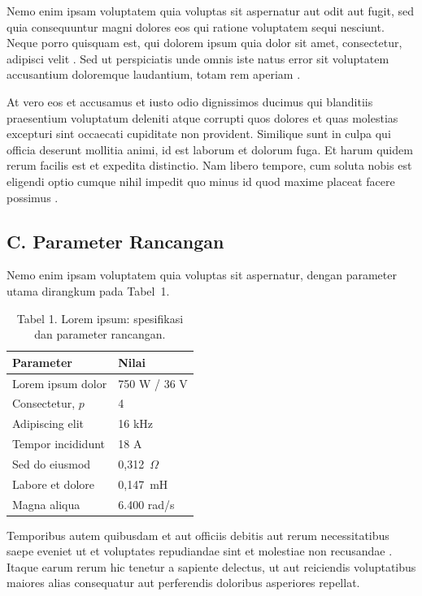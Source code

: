 Nemo enim ipsam voluptatem quia voluptas sit aspernatur aut odit aut fugit, sed
quia consequuntur magni dolores eos qui ratione voluptatem sequi nesciunt. Neque
porro quisquam est, qui dolorem ipsum quia dolor sit amet, consectetur, adipisci
velit \cite{ContohBuku2011}. Sed ut perspiciatis unde omnis iste natus error sit
voluptatem accusantium doloremque laudantium, totam rem aperiam \cite{ContohSatu2024}.

At vero eos et accusamus et iusto odio dignissimos ducimus qui blanditiis
praesentium voluptatum deleniti atque corrupti quos dolores et quas molestias
excepturi sint occaecati cupiditate non provident. Similique sunt in culpa qui
officia deserunt mollitia animi, id est laborum et dolorum fuga. Et harum quidem
rerum facilis est et expedita distinctio. Nam libero tempore, cum soluta nobis
est eligendi optio cumque nihil impedit quo minus id quod maxime placeat facere
possimus \cite{ContohDua2023}.

\subsection{C. Parameter Rancangan}

Nemo enim ipsam voluptatem quia voluptas sit aspernatur, dengan parameter utama
dirangkum pada Tabel~1.

\begin{table}[h]
  \caption{Tabel 1. Lorem ipsum: spesifikasi dan parameter rancangan.}
  \centering
  \begin{tabular}{ll}
  \hline
  \textbf{Parameter} & \textbf{Nilai} \\
  \hline
  Lorem ipsum dolor   & 750 W / 36 V \\
  Consectetur, $p$    & 4 \\
  Adipiscing elit     & 16 kHz \\
  Tempor incididunt   & 18 A \\
  Sed do eiusmod      & 0{,}312~$\Omega$ \\
  Labore et dolore    & 0{,}147~mH \\
  Magna aliqua        & 6.400 rad/s \\
  \hline
  \end{tabular}
\end{table}

Temporibus autem quibusdam et aut officiis debitis aut rerum necessitatibus
saepe eveniet ut et voluptates repudiandae sint et molestiae non recusandae
\cite{ContohProsiding2022}. Itaque earum rerum hic tenetur a sapiente delectus,
ut aut reiciendis voluptatibus maiores alias consequatur aut perferendis
doloribus asperiores repellat.


